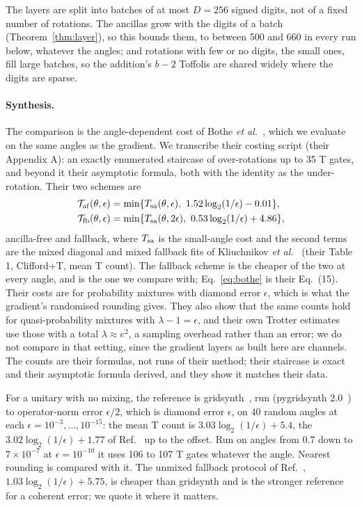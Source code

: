 \documentclass[aps,prx,twocolumn,superscriptaddress,nofootinbib,longbibliography]{revtex4-2}
\theoremstyle{remark}
\newcommand{\Tc}{\mathcal{T}}
\begin{document}
The layers are split into batches of at most $D=256$ signed digits, not of a fixed number of
rotations. The ancillas grow with the digits of a batch (Theorem~\ref{thm:layer}), so this
bounds them, to between 500 and 660 in every run below, whatever the angles; and rotations with few or no
digits, the small ones, fill large batches, so the addition's $b-2$ Toffolis are shared widely
where the digits are sparse.

\paragraph*{Synthesis.}
The comparison is the angle-dependent cost of Bothe \textit{et al.}~\cite{Bothe2026}, which we
evaluate on the same angles as the gradient. We transcribe their costing script (their Appendix
A): an exactly enumerated staircase of over-rotations up to 35 T gates, and beyond it their
asymptotic formula, both with the identity as the under-rotation. Their two schemes are
\begin{align}
  \Tc_{\rm af}(\theta,\epsilon)&=\min\{T_{\rm sa}(\theta,\epsilon),\
    1.52\log_2(1/\epsilon)-0.01\},\\
  \Tc_{\rm fb}(\theta,\epsilon)&=\min\{T_{\rm sa}(\theta,2\epsilon),\
    0.53\log_2(1/\epsilon)+4.86\},\label{eq:bothe}
\end{align}
ancilla-free and fallback, where $T_{\rm sa}$ is the small-angle cost and the second terms are
the mixed diagonal and mixed fallback fits of Kliuchnikov \textit{et al.}~\cite{Kliuchnikov2023}
(their Table 1, Clifford+T, mean T count). The fallback scheme is the cheaper of the two at every
angle, and is the one we compare with; Eq.~\eqref{eq:bothe} is their Eq.~(15). Their costs are
for probability mixtures with diamond error $\epsilon$, which is what the gradient's randomised
rounding gives. They also show that the same counts hold for quasi-probability mixtures with
$\lambda-1=\epsilon$, and their own Trotter estimates use those with a total $\lambda\approx
e^2$, a sampling overhead rather than an error; we do not compare in that setting, since the
gradient layers as built here are channels. The counts are their formulas, not runs of their
method; their staircase is exact and their asymptotic formula derived, and they show it matches
their data.

For a unitary with no mixing, the reference is gridsynth~\cite{RossSelinger2016}, run
(pygridsynth 2.0~\cite{pygridsynth}) to operator-norm error $\epsilon/2$, which is diamond error
$\epsilon$, on 40 random angles at each $\epsilon=10^{-3},\dots,10^{-15}$: the mean T count is
$3.03\log_2(1/\epsilon)+5.4$, the $3.02\log_2(1/\epsilon)+1.77$ of Ref.~\cite{Kliuchnikov2023}
up to the offset. Run on angles from $0.7$ down to $7\times10^{-7}$ at $\epsilon=10^{-10}$ it uses
106 to 107 T gates whatever the angle. Nearest rounding is compared with it. The unmixed fallback
protocol of Ref.~\cite{Kliuchnikov2023}, $1.03\log_2(1/\epsilon)+5.75$, is cheaper than gridsynth
and is the stronger reference for a coherent error; we quote it where it matters.
\end{document}

